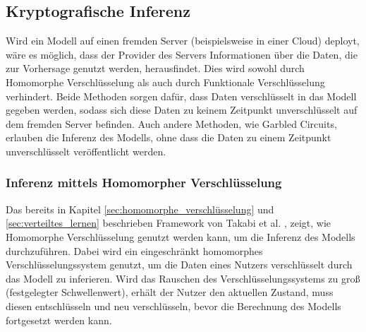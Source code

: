 \subsection{Kryptografische Inferenz}\label{sec:krypto_inferenz}

Wird ein Modell auf einen fremden Server (beispielsweise in einer Cloud) deployt, wäre es möglich, dass der Provider des Servers Informationen über die Daten, die zur Vorhersage genutzt werden, herausfindet.
Dies wird sowohl durch Homomorphe Verschlüsselung als auch durch Funktionale Verschlüsselung verhindert.
Beide Methoden sorgen dafür, dass Daten verschlüsselt in das Modell gegeben werden, sodass sich diese Daten zu keinem Zeitpunkt unverschlüsselt auf dem fremden Server befinden.
Auch andere Methoden, wie Garbled Circuits, erlauben die Inferenz des Modells, ohne dass die Daten zu einem Zeitpunkt unverschlüsselt veröffentlicht werden.


\subsubsection*{Inferenz mittels Homomorpher Verschlüsselung}
Das bereits in Kapitel \ref{sec:homomorphe_verschlüsselung} und \ref{sec:verteiltes_lernen} beschrieben Framework von Takabi et al. \cite{P-104}, zeigt, wie Homomorphe Verschlüsselung genutzt werden kann, um die Inferenz des Modells durchzuführen.
Dabei wird ein eingeschränkt homomorphes Verschlüsselungssystem genutzt, um die Daten eines Nutzers verschlüsselt durch das Modell zu inferieren.
Wird das Rauschen des Verschlüsselungssystems zu groß (festgelegter Schwellenwert), erhält der Nutzer den aktuellen Zustand, muss diesen entschlüsseln und neu verschlüsseln, bevor die Berechnung des Modells fortgesetzt werden kann.

